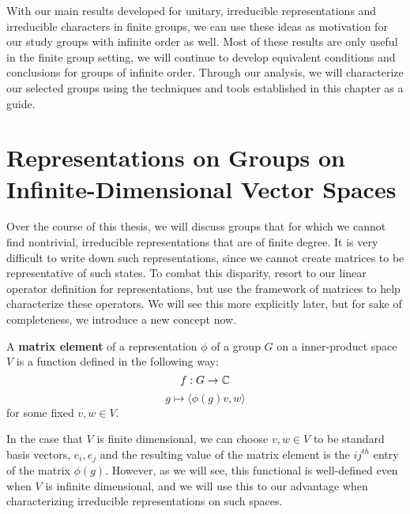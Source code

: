 With our main results developed for unitary, irreducible representations and irreducible characters in finite groups, we can use these ideas as motivation for our study groups with infinite order as well. Most of these results are only useful in the finite group setting, we will continue to develop equivalent conditions and conclusions for groups of infinite order. Through our analysis, we will characterize our selected groups using the techniques and tools established in this chapter as a guide.

\section{Representations on Groups on Infinite-Dimensional Vector Spaces}

Over the course of this thesis, we will discuss groups that for which we cannot find nontrivial, irreducible representations that are of finite degree. It is very difficult to write down such representations, since we cannot create matrices to be representative of such states. To combat this disparity, resort to our linear operator definition for representations, but use the framework of matrices to help characterize these operators. We will see this more explicitly later, but for sake of completeness, we introduce a new concept now.

\begin{definition}
	A \textbf{matrix element} of a representation $\phi$ of a group $G$ on a inner-product space $V$ is a function defined in the following way:
$$f:G\rightarrow\mathbb{C}$$
$$g\mapsto\langle\phi(g)v,w\rangle$$
for some fixed $v,w\in V$.
\end{definition}

In the case that $V$ is finite dimensional, we can choose $v,w\in V$ to be standard basis vectors, $e_i,e_j$ and the resulting value of the matrix element is the $ij^{th}$ entry of the matrix $\phi(g)$. However, as we will see, this functional is well-defined even when $V$ is infinite dimensional, and we will use this to our advantage when characterizing irreducible representations on such spaces.